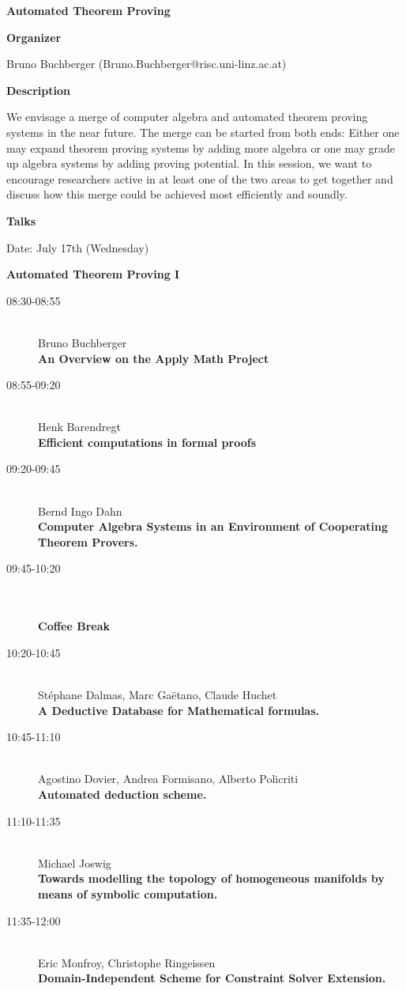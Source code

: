 \begin{center}
{\LARGE \bf Automated Theorem Proving}
\end{center}
\bigskip

\noindent
{\bf Organizer}

\medskip
Bruno Buchberger (Bruno.Buchberger@risc.uni-linz.ac.at)
\bigskip

\noindent
{\bf Description}
\medskip

We envisage a merge of computer algebra and automated theorem proving systems in the near
future. The merge can be started from both ends: Either one may expand theorem proving systems
by adding more algebra or one may grade up algebra systems by adding proving potential. In this
session, we want to encourage researchers active in at least one of the two areas to get together and
discuss how this merge could be achieved most efficiently and soundly. 

\bigskip
\noindent
{\bf Talks}
\medskip

Date: July 17th (Wednesday) 


\begin{center}
{\Large \bf Automated Theorem Proving I
}
\end{center}

\begin{description}
\item[08:30-08:55 ] \ \\
  Bruno Buchberger \\
  {\bf An Overview on the Apply Math Project} 
\item[08:55-09:20] \ \\
  Henk Barendregt \\
  {\bf Efficient computations in formal proofs} 
\item[09:20-09:45] \ \\ 
  Bernd Ingo Dahn \\
  {\bf Computer Algebra Systems in an Environment of Cooperating
    Theorem Provers.} 
\item[09:45-10:20] \ \\
  \ \\
  {\bf Coffee Break}
\item[10:20-10:45] \ \\ 
  St\'ephane Dalmas, Marc Ga\"etano, Claude Huchet \\
  {\bf A Deductive Database for Mathematical formulas.} 
\item[10:45-11:10] \ \\ 
  Agostino Dovier, Andrea Formisano, Alberto Policriti\\
  {\bf Automated deduction scheme.}
\item[11:10-11:35] \ \\ 
  Michael Joswig\\
  {\bf Towards modelling the topology of homogeneous manifolds by
    means of symbolic computation.} 
\item[11:35-12:00] \ \\ 
  Eric Monfroy, Christophe Ringeissen\\
  {\bf Domain-Independent Scheme for Constraint Solver
  Extension.}
\end{description}

